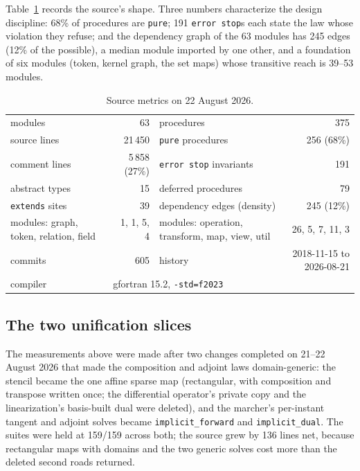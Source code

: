 \documentclass[11pt,a4paper]{article}
\newcommand{\code}[1]{\texttt{#1}}
\begin{document}
Table~\ref{tab:metrics} records the source's shape. Three numbers characterize the design discipline: 68\% of procedures are \code{pure}; 191 \code{error stop}s each state the law whose violation they refuse; and the dependency graph of the 63 modules has 245 edges (12\% of the possible), a median module imported by one other, and a foundation of six modules (token, kernel graph, the set maps) whose transitive reach is 39--53 modules.

\begin{table}[H]
\centering\footnotesize
\begin{tabular}{@{}p{4.6cm}r@{\qquad}p{4.6cm}r@{}}
\toprule
modules & 63 & procedures & 375 \\
source lines & 21\,450 & \code{pure} procedures & 256 (68\%) \\
comment lines & 5\,858 (27\%) & \code{error stop} invariants & 191 \\
abstract types & 15 & deferred procedures & 79 \\
\code{extends} sites & 39 & dependency edges (density) & 245 (12\%) \\
modules: graph, token, relation, field & 1, 1, 5, 4 & modules: operation, transform, map, view, util & 26, 5, 7, 11, 3 \\
commits & 605 & history & 2018-11-15 to 2026-08-21 \\
compiler & \multicolumn{3}{l}{gfortran 15.2, \code{-std=f2023}} \\
\bottomrule
\end{tabular}
\caption{Source metrics on 22 August 2026.}
\label{tab:metrics}
\end{table}

\subsection{The two unification slices}

The measurements above were made after two changes completed on 21--22 August 2026 that made the composition and adjoint laws domain-generic: the stencil became the one affine sparse map (rectangular, with composition and transpose written once; the differential operator's private copy and the linearization's basis-built dual were deleted), and the marcher's per-instant tangent and adjoint solves became \code{implicit\_forward} and \code{implicit\_dual}. The suites were held at 159/159 across both; the source grew by 136 lines net, because rectangular maps with domains and the two generic solves cost more than the deleted second roads returned.
\end{document}
